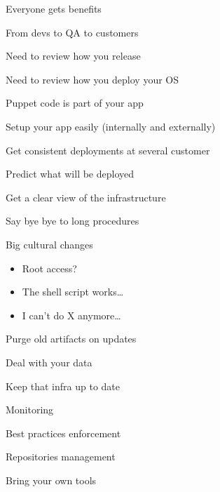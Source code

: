 \begin{iframe}
\item Everyone gets benefits
\item From devs to QA to customers
\item Need to review how you release
\item Need to review how you deploy your OS
\item Puppet code is part of your app
\end{iframe}
\begin{iframe}[Advantages]
\item Setup your app easily (internally and externally)
\item Get consistent deployments at several customer
\item Predict what will be deployed
\item Get a clear view of the infrastructure
\item Say bye bye to long procedures
\end{iframe}
\begin{iframe}
\item Big cultural changes
    \begin{itemize}
        \item Root access?
        \item The shell script works\dots
        \item I can't do X anymore\dots
    \end{itemize}
\item Purge old artifacts on updates
\item Deal with your data
\item Keep that infra up to date
\end{iframe}

\begin{iframe}
\item Monitoring
\item Best practices enforcement
\item Repositories management
\item Bring your own tools
\end{iframe}

\thankyouSlide
\renewcommand{\insertLogo}{}
\contactSlide
